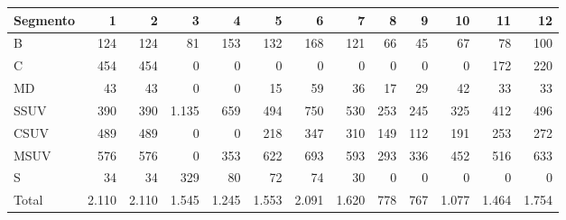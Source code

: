 \begin{tabular}{lrrrrrrrrrrrr}
\toprule
Segmento & 1 & 2 & 3 & 4 & 5 & 6 & 7 & 8 & 9 & 10 & 11 & 12 \\
\midrule
B & 124 & 124 & 81 & 153 & 132 & 168 & 121 & 66 & 45 & 67 & 78 & 100 \\
C & 454 & 454 & 0 & 0 & 0 & 0 & 0 & 0 & 0 & 0 & 172 & 220 \\
MD & 43 & 43 & 0 & 0 & 15 & 59 & 36 & 17 & 29 & 42 & 33 & 33 \\
SSUV & 390 & 390 & 1.135 & 659 & 494 & 750 & 530 & 253 & 245 & 325 & 412 & 496 \\
CSUV & 489 & 489 & 0 & 0 & 218 & 347 & 310 & 149 & 112 & 191 & 253 & 272 \\
MSUV & 576 & 576 & 0 & 353 & 622 & 693 & 593 & 293 & 336 & 452 & 516 & 633 \\
S & 34 & 34 & 329 & 80 & 72 & 74 & 30 & 0 & 0 & 0 & 0 & 0 \\
Total & 2.110 & 2.110 & 1.545 & 1.245 & 1.553 & 2.091 & 1.620 & 778 & 767 & 1.077 & 1.464 & 1.754 \\
\bottomrule
\end{tabular}
